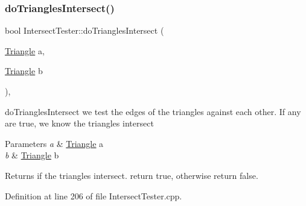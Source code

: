 \subsubsection{\texorpdfstring{do\+Triangles\+Intersect()}{doTrianglesIntersect()}}
{\footnotesize\ttfamily bool Intersect\+Tester\+::do\+Triangles\+Intersect (\begin{DoxyParamCaption}\item[{\hyperlink{class_triangle}{Triangle}}]{a,  }\item[{\hyperlink{class_triangle}{Triangle}}]{b }\end{DoxyParamCaption})\hspace{0.3cm}{\ttfamily [static]}, {\ttfamily [private]}}



do\+Triangles\+Intersect we test the edges of the triangles against each other. If any are true, we know the triangles intersect 


\begin{DoxyParams}{Parameters}
{\em a} & \hyperlink{class_triangle}{Triangle} a \\
\hline
{\em b} & \hyperlink{class_triangle}{Triangle} b \\
\hline
\end{DoxyParams}
\begin{DoxyReturn}{Returns}
if the triangles intersect. return true, otherwise return false. 
\end{DoxyReturn}


Definition at line 206 of file Intersect\+Tester.\+cpp.


